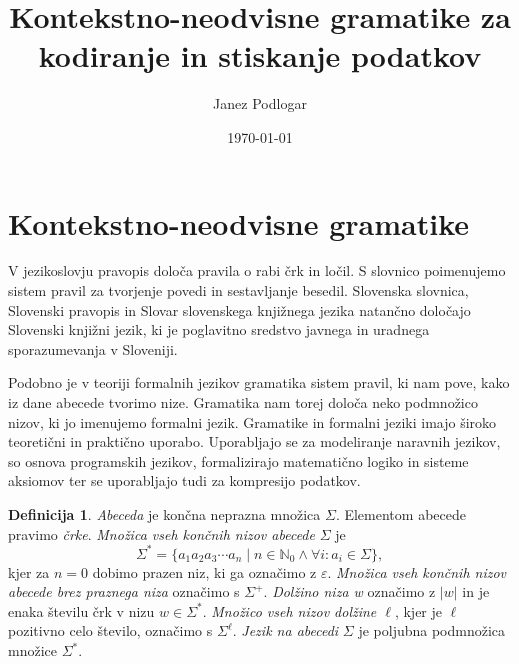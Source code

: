 \documentclass{amsart}
\title{Kontekstno-neodvisne gramatike za kodiranje in stiskanje podatkov}
\author{Janez Podlogar}
\date{\today}
\newcommand{\N}{\mathbb{N}}
\theoremstyle{definition}
\newtheorem{definicija}{Definicija}[section]
\theoremstyle{plain} %
\begin{document}




\maketitle

\tableofcontents

\section{Kontekstno-neodvisne gramatike}

V jezikoslovju pravopis določa pravila o rabi črk in ločil. S slovnico poimenujemo sistem pravil za tvorjenje
povedi in sestavljanje besedil. Slovenska slovnica, Slovenski pravopis in Slovar slovenskega knjižnega jezika
natančno določajo Slovenski knjižni jezik, ki je poglavitno sredstvo javnega in uradnega sporazumevanja v Sloveniji.


Podobno je v teoriji formalnih jezikov gramatika sistem pravil, ki nam pove, kako iz dane abecede tvorimo nize. Gramatika nam torej določa
neko podmnožico nizov, ki jo imenujemo formalni jezik. Gramatike in formalni jeziki imajo široko teoretični in praktično
uporabo. Uporabljajo se za modeliranje naravnih jezikov, so osnova programskih jezikov, formalizirajo matematično logiko in
sisteme aksiomov ter se uporabljajo tudi za kompresijo podatkov.

\begin{definicija}

    \textit{Abeceda} je končna neprazna množica $ \Sigma $. Elementom abecede pravimo \textit{črke}.
    \textit{Množica vseh končnih nizov abecede} $ \Sigma $ je
    \[
        \Sigma^* = \{ a_1 a_2 a_3 \cdots a_n \mid n \in \N_0 \land \forall i: a_i \in \Sigma \}, 
    \]
    kjer za $ n = 0 $ dobimo prazen niz, ki ga označimo z $ \varepsilon $.
    \textit{Množica vseh končnih nizov abecede brez praznega niza} označimo s $ \Sigma^+ $.
    \textit{Dolžino niza w} označimo z $ |w| $ in je enaka številu črk v nizu $ w \in \Sigma^* $.
    \textit{Množico vseh nizov dolžine $ \ell $}, kjer je $ \ell $ pozitivno celo število, označimo s $ \Sigma^\ell $.
    \textit{Jezik na abecedi} $ \Sigma $ je poljubna podmnožica množice $ \Sigma^* $.
    

\end{definicija}
\end{document}
